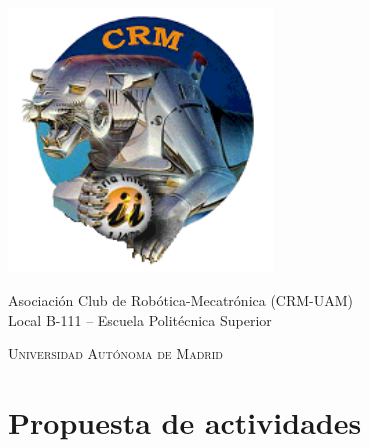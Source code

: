 \documentclass[12pt,twoside]{report}
\begin{document}
\begin{titlepage}
\includegraphics[width = 7cm]{fotos/logo_crm-192x192.png}

{\large Asociación Club de Robótica-Mecatrónica (CRM-UAM)} \\
Local B-111 -- Escuela Politécnica Superior

\vfill

\textsc{\Large Universidad Autónoma de Madrid}\\[0.5cm]

\vfill



\makeatletter
{ \Large \@date }
\vfill
\makeatother


\end{titlepage}

\clearpage{\pagestyle{empty}\cleardoublepage}


\setcounter{page}{1}
\pagestyle{fancy}






\begin{spacing}{0.1}
\tableofcontents
\end{spacing}

\clearpage{\pagestyle{empty}\cleardoublepage}

\setcounter{page}{1}

\fancyhead[LE,RO]{\slshape}
\fancyhead[LO,RE]{\slshape \leftmark}




\chapter{Propuesta de actividades}
\end{document}
